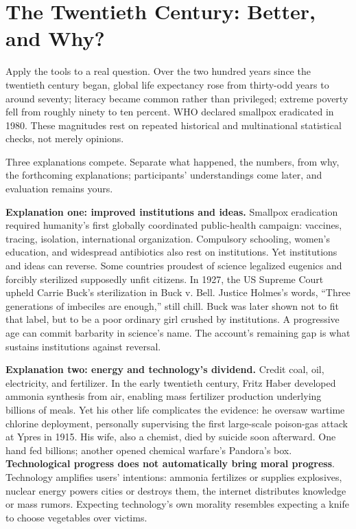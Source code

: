 \section{The Twentieth Century: Better, and Why?}
Apply the tools to a real question. Over the two hundred years since the twentieth century began, global life expectancy rose from thirty-odd years to around seventy; literacy became common rather than privileged; extreme poverty fell from roughly ninety to ten percent. WHO declared smallpox eradicated in 1980. These magnitudes rest on repeated historical and multinational statistical checks, not merely opinions.

Three explanations compete. Separate what happened, the numbers, from why, the forthcoming explanations; participants' understandings come later, and evaluation remains yours.

\textbf{Explanation one: improved institutions and ideas.} Smallpox eradication required humanity's first globally coordinated public-health campaign: vaccines, tracing, isolation, international organization. Compulsory schooling, women's education, and widespread antibiotics also rest on institutions. Yet institutions and ideas can reverse. Some countries proudest of science legalized eugenics and forcibly sterilized supposedly unfit citizens. In 1927, the US Supreme Court upheld Carrie Buck's sterilization in Buck v. Bell. Justice Holmes's words, ``Three generations of imbeciles are enough,'' still chill. Buck was later shown not to fit that label, but to be a poor ordinary girl crushed by institutions. A progressive age can commit barbarity in science's name. The account's remaining gap is what sustains institutions against reversal.

\textbf{Explanation two: energy and technology's dividend.} Credit coal, oil, electricity, and fertilizer. In the early twentieth century, Fritz Haber developed ammonia synthesis from air, enabling mass fertilizer production underlying billions of meals. Yet his other life complicates the evidence: he oversaw wartime chlorine deployment, personally supervising the first large-scale poison-gas attack at Ypres in 1915. His wife, also a chemist, died by suicide soon afterward. One hand fed billions; another opened chemical warfare's Pandora's box. \textbf{Technological progress does not automatically bring moral progress}. Technology amplifies users' intentions: ammonia fertilizes or supplies explosives, nuclear energy powers cities or destroys them, the internet distributes knowledge or mass rumors. Expecting technology's own morality resembles expecting a knife to choose vegetables over victims.

